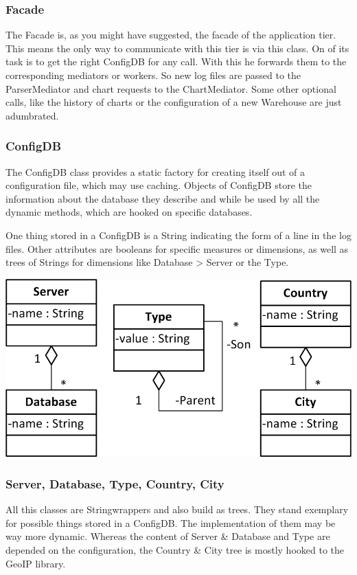 \subsubsection*{Facade}
The Facade is, as you might have suggested, the facade of the application tier. 
This means the only way to communicate with this tier is via this class.
On of its task is to get the right ConfigDB for any call. With this he forwards
them to the corresponding mediators or workers. So new log files are passed to
the ParserMediator and chart requests to the ChartMediator. Some other optional
calls, like the history of charts or the configuration of a new Warehouse are just
adumbrated.


\subsubsection*{ConfigDB}
The ConfigDB class provides a static factory for creating itself out of a configuration
file, which may use caching. Objects of ConfigDB store the information about the database
they describe and while be used by all the dynamic methods, which are hooked on specific
databases. 

One thing stored in a ConfigDB is a String indicating the form of a line in the log files.
Other attributes are booleans for specific measures or dimensions, as well as trees of
Strings for dimensions like Database > Server or the Type.


\begin{center}
\includegraphics{Pictures/Parts/Strings.png}
\end{center}  
\subsubsection*{Server, Database, Type, Country, City}
All this classes are Stringwrappers and also build as trees. They stand exemplary for
possible things stored in a ConfigDB. The implementation of them may be way more dynamic.
Whereas the content of Server \& Database and Type are depended on the configuration,
the Country \& City tree is mostly hooked to the GeoIP library.


